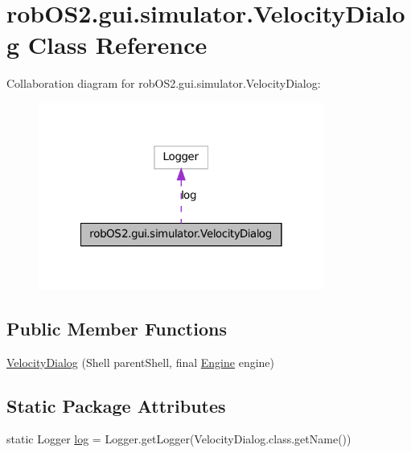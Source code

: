 \hypertarget{classrob_o_s2_1_1gui_1_1simulator_1_1_velocity_dialog}{
\section{robOS2.gui.simulator.VelocityDialog Class Reference}
\label{classrob_o_s2_1_1gui_1_1simulator_1_1_velocity_dialog}
}


Collaboration diagram for robOS2.gui.simulator.VelocityDialog:\nopagebreak
\begin{figure}[H]
\begin{center}
\leavevmode
\includegraphics[width=266pt]{classrob_o_s2_1_1gui_1_1simulator_1_1_velocity_dialog__coll__graph}
\end{center}
\end{figure}
\subsection*{Public Member Functions}
\begin{DoxyCompactItemize}
\item 
\hyperlink{classrob_o_s2_1_1gui_1_1simulator_1_1_velocity_dialog_accd46330184d6f056eed88a25458e306}{VelocityDialog} (Shell parentShell, final \hyperlink{classrob_o_s2_1_1simulator_1_1_engine}{Engine} engine)
\end{DoxyCompactItemize}
\subsection*{Static Package Attributes}
\begin{DoxyCompactItemize}
\item 
static Logger \hyperlink{classrob_o_s2_1_1gui_1_1simulator_1_1_velocity_dialog_ad96ed4d3960dc2b25370a9d4f284c660}{log} = Logger.getLogger(VelocityDialog.class.getName())
\end{DoxyCompactItemize}


